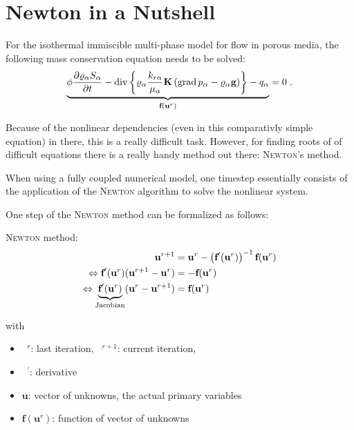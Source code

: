 \chapter{Newton in a Nutshell}

For the isothermal immiscible multi-phase model for flow in porous
media, the following mass conservation equation needs to be solved:
\begin{align}
\underbrace{
  \phi \frac{\partial \varrho_\alpha S_\alpha}{\partial t}
 -
 \text{div} \left\{
 \varrho_\alpha \frac{k_{r\alpha}}{\mu_\alpha} \mbox{\bf K} \left(\text{grad}\, p_\alpha - \varrho_{\alpha} \mbox{\bf g} \right)
 \right\} - q_\alpha} _
{\textbf{f}(\textbf{u}^r)}
= 0 \; .
\end{align}

Because of the nonlinear dependencies (even in this comparativly simple equation) in there, this is a really difficult task. However, for finding roots of of difficult equations there is a really handy method out there: \textsc{Newton}'s method. 

When using a fully coupled numerical model, one timestep essentially consists of the application of the \textsc{Newton} algorithm to solve the nonlinear system.

One step of the \textsc{Newton} method can be formalized as follows:

\textsc{Newton} method: 
\begin{subequations}
\begin{align}
\label{NewtonGen}
\textbf{u}^{r+1} &= \textbf{u}^r -  \left(\textbf{f}^\prime (\textbf{u}^r) \right)^{-1} \textbf{f}(\textbf{u}^r) \\
\Leftrightarrow {\textbf{f}^{\prime}(\textbf{u}^r)}  ( \textbf{u}^{r+1}-\textbf{u}^r) &= -\textbf{f}(\textbf{u}^r) \\
\Leftrightarrow \underbrace{\textbf{f}^{\prime}(\textbf{u}^r)}_{\textnormal{Jacobian}} ( \textbf{u}^r - \textbf{u}^{r+1}) &= \textbf{f}(\textbf{u}^r) \label{NewtonAsUsed}
\end{align}
\end{subequations}

\noindent with
\begin{itemize}
\item $\phantom{a}^r$: last iteration, $\phantom{a}^{r+1}$: current iteration,
\item $\phantom{a}^\prime$: derivative
\item $\textbf{u}$: vector of unknowns, the actual primary variables
\item $\textbf{f}(\textbf{u}^r)$: function of vector of unknowns
\end{itemize}

